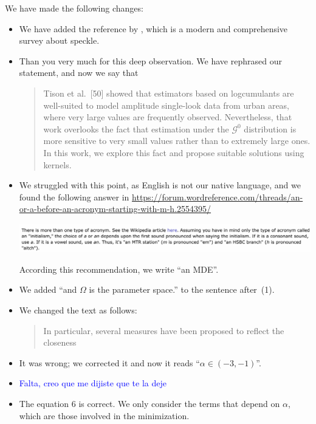 \documentclass{ar2rc}
\begin{document}
	\AR We have made the following changes:
	\begin{itemize}
		\item We have added the reference by \citet{SARImageStatisticalModelingPartISinglePixelStatisticalModels}, which is a modern and comprehensive survey about speckle.
		\item Than you very much for this deep observation. We have rephrased our statement, and now we say that
		\begin{quote}
			Tison et al.~[50] showed that estimators based on logcumulants 
			are well-suited to model amplitude single-look data from urban areas, where very large values are frequently observed.
			Nevertheless, that work overlooks the fact that estimation under the $\mathcal G^0$ distribution is more sensitive to very small values rather than to extremely large ones.
			In this work, we explore this fact and propose suitable solutions using kernels.
		\end{quote}
		\item We struggled with this point, as English is not our native language, and we found the following answer in \url{https://forum.wordreference.com/threads/an-or-a-before-an-acronym-starting-with-m-h.2554395/}
		\begin{center}
			\includegraphics[width=\linewidth]{AorAN.png}
		\end{center}
		According this recommendation, we write ``an MDE''.
		\item We added ``and $\Omega$ is the parameter space.'' to the sentence after~(1).
		\item We changed the text as follows:
		\begin{quote}
			In particular, several measures have been proposed to reflect the closeness  \DIFdelbegin {} \DIFdelend \DIFaddbegin {}\DIFaddend
		\end{quote}
		\item It was wrong; we corrected it and now it reads ``$\alpha \in (-3,-1)$''.
		\item \textcolor{blue}{Falta, creo que me dijiste que te la deje}
		\item The equation $6$ is correct. We only consider the terms that depend on $\alpha$, which are those involved in the minimization.

\end{itemize}
\end{document}
